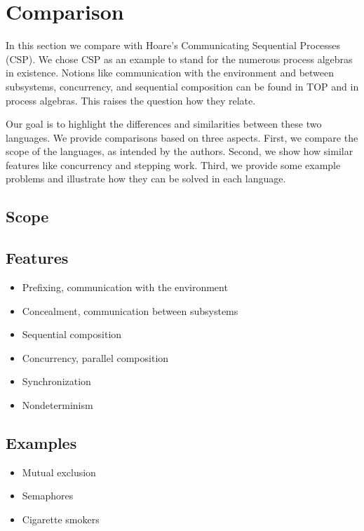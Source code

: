 
\section{Comparison}

In this section we compare \tophat with Hoare's Communicating Sequential Processes (CSP).
We chose CSP as an example to stand for the numerous process algebras in existence.
Notions like communication with the environment and between subsystems, concurrency, and sequential composition can be found in TOP and in process algebras.
This raises the question how they relate.

Our goal is to highlight the differences and similarities between these two languages.
We provide comparisons based on three aspects.
First, we compare the scope of the languages, as intended by the authors.
Second, we show how similar features like concurrency and stepping work.
Third, we provide some example problems and illustrate how they can be solved in each language.

\subsection{Scope}

\subsection{Features}

\begin{itemize}
\item Prefixing, communication with the environment
\item Concealment, communication between subsystems
\item Sequential composition
\item Concurrency, parallel composition
\item Synchronization
\item Nondeterminism
\end{itemize}

\subsection{Examples}

\begin{itemize}
\item Mutual exclusion
\item Semaphores
\item Cigarette smokers
\end{itemize}
